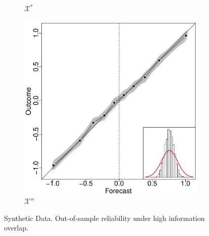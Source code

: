 \documentclass[11pt]{article}
\theoremstyle{definition}
\theoremstyle{definition}
\begin{document}
\begin{figure}[t!]
\begin{subfigure}[b]{0.241\textwidth}
                \caption{$\mathcal{X}^*$ }
        \label{ELOPHighOverlap}
        \end{subfigure}
           \begin{subfigure}[b]{0.241\textwidth}
                \includegraphics[width=\textwidth]{SimDepOPT.pdf}
                \caption{$\mathcal{X}''$ }
        \label{RevHighOverlap}
        \end{subfigure}
          \caption{Synthetic Data. Out-of-sample reliability under high information overlap. }
   \label{HighOverlap}
\end{figure}
\end{document}
